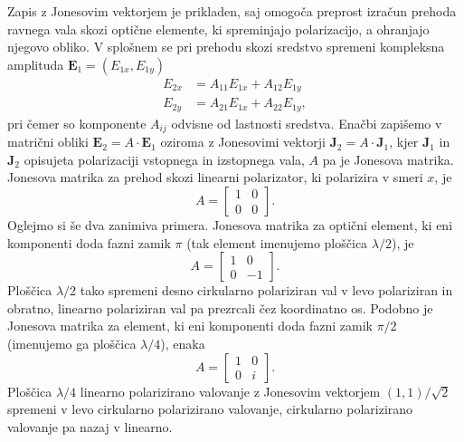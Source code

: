 Zapis z Jonesovim vektorjem je prikladen, saj omogoča preprost izračun
prehoda ravnega vala skozi optične elemente, ki spreminjajo polarizacijo,
a ohranjajo njegovo obliko. V splošnem se pri prehodu skozi
sredstvo spremeni kompleksna amplituda $\mathbf{E}_1 = (E_{1x}, E_{1y})$
\begin{align}
E_{2x} & =A_{11}E_{1x}+A_{12}E_{1y}\\
E_{2y} & =A_{21}E_{1x}+A_{22}E_{1y},
\end{align}
pri čemer so komponente $A_{ij}$ odvisne od lastnosti sredstva. Enačbi zapišemo 
v matrični obliki $\mathbf{E}_{2}=A\cdot\mathbf{E}_{1}$ oziroma z Jonesovimi
vektorji $\mathbf{J}_{2}=A\cdot\mathbf{J}_{1}$, kjer $\mathbf{J}_{1}$ in $\mathbf{J}_{2}$
opisujeta polarizaciji vstopnega in izstopnega vala, $A$ pa je Jonesova
matrika. Jonesova matrika za prehod skozi linearni polarizator, ki
polarizira v smeri $x$, je
\begin{equation}
A=\left[\begin{array}{cc}
1 & 0\\
0 & 0
\end{array}\right].
\end{equation}
Oglejmo si še dva zanimiva primera.
Jonesova matrika za optični element, ki eni komponenti doda fazni zamik $\pi$ (tak element 
imenujemo ploščica $\lambda/2$), je
\begin{equation}
A=\left[\begin{array}{cc}
1 & 0\\
0 & -1
\end{array}\right].
\end{equation}
Ploščica $\lambda/2$ tako spremeni desno cirkularno polariziran val v levo polariziran in obratno,
linearno polariziran val pa prezrcali čez koordinatno os. Podobno je 
Jonesova matrika za element, ki eni komponenti doda fazni zamik $\pi/2$ (imenujemo ga 
ploščica $\lambda/4$), enaka
\begin{equation}
A=\left[\begin{array}{cc}
1 & 0\\
0 & i
\end{array}\right].
\end{equation}
Ploščica $\lambda/4$ linearno polarizirano valovanje z Jonesovim vektorjem $(1,1)/\sqrt{2}$
spremeni v levo cirkularno polarizirano valovanje, cirkularno polarizirano
valovanje pa nazaj v linearno. 

